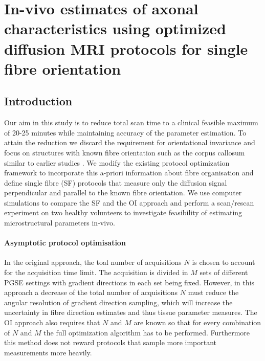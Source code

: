 \newcommand{\SFshort}{SF$_{90}$}
\newcommand{\SFlong}{SF$_{360}$}
\newcommand{\OIlong}{OI$_{360}$}
\newcommand{\mat}[1]{\ensuremath{\vec{#1}}}
\newcommand{\vek}[1]{\ensuremath{\vec{#1}}}

\newenvironment{tikzfigures}%
{\noindent\ignorespaces}%
{\par\noindent%
\ignorespacesafterend}

\section{In-vivo estimates of axonal characteristics using optimized diffusion MRI protocols for single fibre orientation}
\subsection*{Introduction}
Our aim in this study is to reduce total scan time to a clinical feasible maximum of 20-25 minutes while maintaining accuracy of the parameter estimation. To attain the reduction we discard the requirement for orientational invariance and focus on structures with known fibre orientation such as the corpus callosum similar to earlier studies \cite{assaf2008,barazany2009}. We modify the existing protocol optimization framework \cite{alexander2008} to incorporate this a-priori information about fibre organisation and define single fibre (SF) protocols that measure only the diffusion signal perpendicular and parallel to the known fibre orientation. We use computer simulations to compare the SF and the OI approach and perform a scan/rescan experiment on two healthy volunteers to investigate feasibility of estimating microstructural parameters in-vivo. 

\paragraph{Asymptotic protocol optimisation}
In the original approach, the toal number of acquisitions $N$ is chosen to account for the acquisition time limit. The acquisition is divided in $M$ sets of different PGSE settings with gradient directions in each set being fixed. However, in this approach a decrease of the total number of acquisitions $N$ must reduce the angular resolution of gradient direction sampling, which will increase the uncertainty in fibre direction estimates and thus tissue parameter measures. The OI approach also requires that $N$ and $M$ are known so that for every combination of $N$ and $M$ the full optimization algorithm has to be performed. Furthermore this method does not reward protocols that sample more important measurements more heavily.

